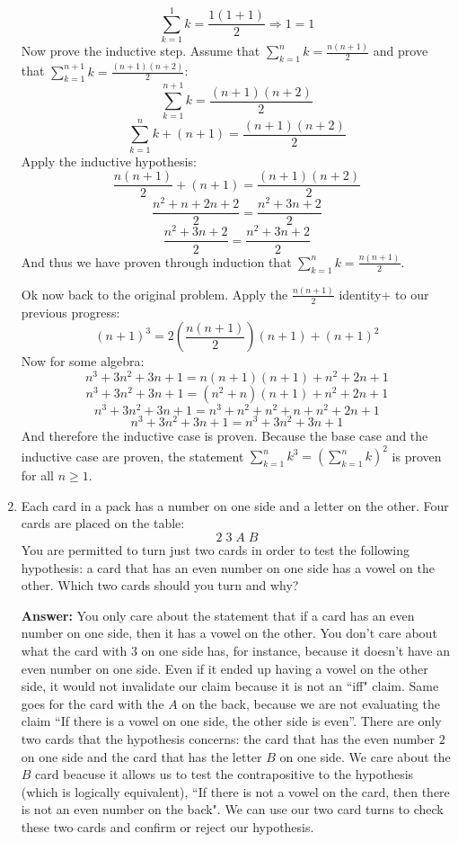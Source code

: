\documentclass[11pt]{article}
\begin{document}
\begin{enumerate}
\[\sum_{k=1}^{1} k =  \frac{1(1+1)}{2} \Rightarrow 1 = 1\]
Now prove the inductive step. Assume that $\sum_{k=1}^{n} k = \frac{n(n+1)}{2}$ and prove that $\sum_{k=1}^{n+1} k = \frac{(n+1)(n+2)}{2}$: 
\[ \sum_{k=1}^{n+1} k = \frac{(n+1)(n+2)}{2} \]
\[ \sum_{k=1}^{n} k + (n+1) = \frac{(n+1)(n+2)}{2} \]
Apply the inductive hypothesis:
\[ \frac{n(n+1)}{2} + (n+1) = \frac{(n+1)(n+2)}{2} \]
\[ \frac{n^2 + n + 2n + 2}{2}= \frac{n^2 + 3n + 2}{2}\]
\[ \frac{n^2 + 3n + 2}{2} = \frac{n^2 + 3n + 2}{2}\]
And thus we have proven through induction that $\sum_{k=1}^{n} k = \frac{n(n+1)}{2}$. 

Ok now back to the original problem. Apply the $\frac{n(n+1)}{2}$ identity+ to our previous progress:
\[ (n+1)^3 = 2(\frac{n(n+1)}{2})(n+1) + (n+1)^2\]
Now for some algebra:
\[ n^3 + 3n^2 +3n + 1 = n(n+1)(n+1)+ n^2 + 2n + 1 \]
\[ n^3 + 3n^2 +3n + 1 = (n^2+n)(n+1) + n^2 + 2n + 1\]
\[ n^3 + 3n^2 +3n + 1 = n^3 + n^2 + n^2 + n + n^2 + 2n + 1\]
\[ n^3 + 3n^2 +3n + 1 = n^3 + 3n^2 + 3n + 1\] 
And therefore the inductive case is proven. Because the base case and the inductive case are proven, the statement $\sum_{k=1}^n k^3 = \left(\sum_{k=1}^n k\right)^2$ is proven for all $n \geq 1$.

\rightline{$\Box$}
\item
Each card in a pack has a number on one side and a letter on the other. Four cards are
placed on the table:
\[ \boxed{2} \; \boxed{3} \; \boxed{A} \; \boxed{B}\]
You are permitted to turn just two cards in order to test the following hypothesis: a card that
has an even number on one side has a vowel on the other. Which two cards should you turn and why? 

\bigskip\textbf{Answer: } You only care about the statement that if a card has an even number on one side, then it has a vowel on the other. You don't care about what the card with 3 on one side has, for instance, because it doesn't have an even number on one side. Even if it ended up having a vowel on the other side, it would not invalidate our claim because it is not an ``iff" claim. Same goes for the card with the $A$ on the back, because we are not evaluating the claim ``If there is a vowel on one side, the other side is even''. There are only two cards that the hypothesis concerns: the card that has the even number $2$ on one side and the card that has the letter $B$ on one side. We care about the $B$ card beacuse it allows us to test the contrapositive to the hypothesis (which is logically equivalent), ``If there is not a vowel on the card, then there is not an even number on the back". We can use our two card turns to check these two cards and confirm or reject our hypothesis. 


\end{enumerate}
\end{document}

